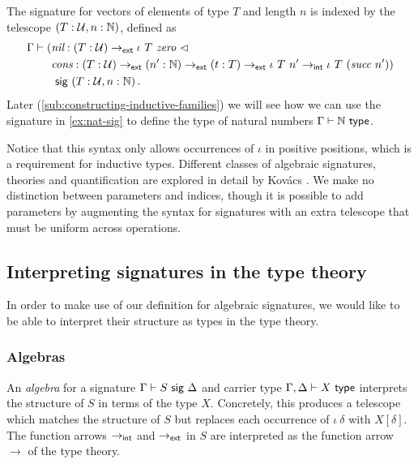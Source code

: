 \begin{example}[Vectors]\label{ex:vec-sig}
The signature for vectors of elements of type $T$ and length $n$ is indexed by
the telescope $(T : \mathcal{U}, n : \mathbb{N})$, defined as
\begin{align*}
\Gamma \vdash (&\n{nil} : (T : \univ) \to\external \iota\ T\ \n{zero}\ \lhd \\
&\n{cons} : (T : \univ) \to\external (n' : \mathbb{N}) \to\external (t : T)
\to\external \iota\ T\ n' \to\internal \iota\ T\ (\n{succ}\ n')) \\ &\sig (T :
\univ, n : \mathbb{N}) \,.
\end{align*}
Later (\cref{sub:constructing-inductive-families}) we will see how we can use the signature in \cref{ex:nat-sig} to define
the type of natural numbers $\Gamma \vdash \mathbb{N} \ \textsf{type}$.
\end{example}

Notice that this syntax only allows occurrences of $\iota$ in positive
positions, which is a requirement for inductive types. Different classes of
algebraic signatures, theories and quantification are explored in detail by
Kov\'acs \cite{Kovacs2023-gq}. We make no distinction between parameters and
indices, though it is possible to add parameters by augmenting the syntax for
signatures with an extra telescope that must be uniform across operations.

\subsection{Interpreting signatures in the type theory} \label{sub:algebras}

In order to make use of our definition for algebraic signatures, we would like
to be able to interpret their structure as types in the type theory.

\subsubsection{Algebras}

An \emph{algebra} for a signature $\Gamma \vdash S \ \textsf{sig}\  \Delta$ and carrier type
$\Gamma, \Delta \vdash X \ \textsf{type}$ interprets the structure of $S$ in terms of the
type $X$. Concretely, this produces a telescope which matches the structure of
$S$ but replaces each occurrence of $\iota\ \delta$ with $X[\delta]$. The
function arrows $\to_{\textsf{int}}$ and $\to_{\textsf{ext}}$ in $S$ are interpreted as the
function arrow $\to$ of the type theory.

